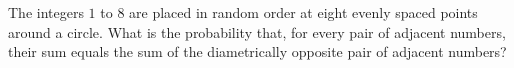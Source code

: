 The integers \(1\) to \(8\) are placed in random order at eight evenly spaced points around a circle. What is the probability that, for every pair of adjacent numbers, their sum equals the sum of the diametrically opposite pair of adjacent numbers?
